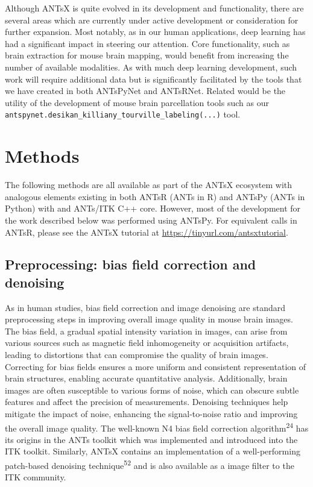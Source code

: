 \documentclass[
  12pt,
]{article}
\begin{document}
Although ANTsX is quite evolved in its development and functionality,
there are several areas which are currently under active development or
consideration for further expansion. Most notably, as in our human
applications, deep learning has had a significant impact in steering our
attention. Core functionality, such as brain extraction for mouse brain
mapping, would benefit from increasing the number of available
modalities. As with much deep learning development, such work will
require additional data but is significantly facilitated by the tools
that we have created in both ANTsPyNet and ANTsRNet. Related would be
the utility of the development of mouse brain parcellation tools such as
our \texttt{antspynet.desikan\_killiany\_tourville\_labeling(...)} tool.

\clearpage
\newpage

\hypertarget{methods}{%
\section*{Methods}\label{methods}}

The following methods are all available as part of the ANTsX ecosystem
with analogous elements existing in both ANTsR (ANTs in R) and ANTsPy
(ANTs in Python) with and ANTs/ITK C++ core. However, most of the
development for the work described below was performed using ANTsPy. For
equivalent calls in ANTsR, please see the ANTsX tutorial at
\url{https://tinyurl.com/antsxtutorial}.

\hypertarget{preprocessing-bias-field-correction-and-denoising}{%
\subsection*{Preprocessing: bias field correction and
denoising}\label{preprocessing-bias-field-correction-and-denoising}}

As in human studies, bias field correction and image denoising are
standard preprocessing steps in improving overall image quality in mouse
brain images. The bias field, a gradual spatial intensity variation in
images, can arise from various sources such as magnetic field
inhomogeneity or acquisition artifacts, leading to distortions that can
compromise the quality of brain images. Correcting for bias fields
ensures a more uniform and consistent representation of brain
structures, enabling accurate quantitative analysis. Additionally, brain
images are often susceptible to various forms of noise, which can
obscure subtle features and affect the precision of measurements.
Denoising techniques help mitigate the impact of noise, enhancing the
signal-to-noise ratio and improving the overall image quality. The
well-known N4 bias field correction algorithm\textsuperscript{24} has
its origins in the ANTs toolkit which was implemented and introduced
into the ITK toolkit. Similarly, ANTsX contains an implementation of a
well-performing patch-based denoising technique\textsuperscript{52} and
is also available as a image filter to the ITK community.
\end{document}
